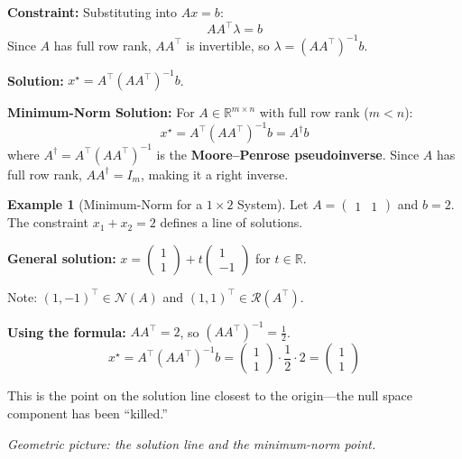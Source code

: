 \documentclass[10pt, twocolumn]{article}
\theoremstyle{definition}
\newtheorem{example}{Example}
\theoremstyle{plain}
\newcommand{\RR}{\mathbb{R}}
\newcommand{\NN}{\mathcal{N}}
\newcommand{\Range}{\mathcal{R}}
\begin{document}
\textbf{Constraint:} Substituting into $Ax = b$:
\[
    AA^\top \lambda = b
\]
Since $A$ has full row rank, $AA^\top$ is invertible, so $\lambda = (AA^\top)^{-1}b$.

\textbf{Solution:} $x^\star = A^\top(AA^\top)^{-1}b$.

\begin{result}
\textbf{Minimum-Norm Solution:} For $A \in \RR^{m \times n}$ with full row rank ($m < n$):
\[
    x^\star = A^\top(AA^\top)^{-1}b = A^\dagger b
\]
where $A^\dagger = A^\top(AA^\top)^{-1}$ is the \textbf{Moore--Penrose pseudoinverse}. Since $A$ has full row rank, $AA^\dagger = I_m$, making it a right inverse.
\end{result}

\begin{example}[Minimum-Norm for a $1 \times 2$ System]
Let $A = \begin{pmatrix} 1 & 1 \end{pmatrix}$ and $b = 2$. The constraint $x_1 + x_2 = 2$ defines a line of solutions.

\textbf{General solution:} $x = \begin{pmatrix} 1 \\ 1 \end{pmatrix} + t\begin{pmatrix} 1 \\ -1 \end{pmatrix}$ for $t \in \RR$.

Note: $(1, -1)^\top \in \NN(A)$ and $(1, 1)^\top \in \Range(A^\top)$.

\textbf{Using the formula:} $AA^\top = 2$, so $(AA^\top)^{-1} = \frac{1}{2}$.
\[
    x^\star = A^\top(AA^\top)^{-1}b = \begin{pmatrix} 1 \\ 1 \end{pmatrix} \cdot \frac{1}{2} \cdot 2 = \begin{pmatrix} 1 \\ 1 \end{pmatrix}
\]

This is the point on the solution line closest to the origin---the null space component has been ``killed.''
\end{example}

\textit{Geometric picture: the solution line and the minimum-norm point.}
\end{document}
